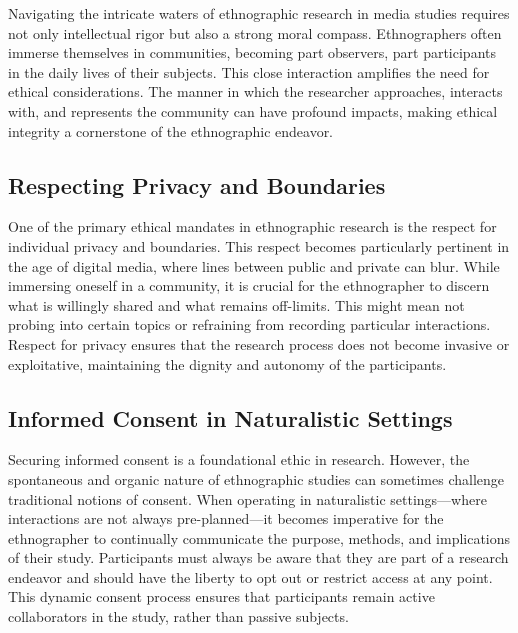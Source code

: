 \documentclass[
  b5paper]{book}
\begin{document}
Navigating the intricate waters of ethnographic research in media studies requires not only intellectual rigor but also a strong moral compass. Ethnographers often immerse themselves in communities, becoming part observers, part participants in the daily lives of their subjects. This close interaction amplifies the need for ethical considerations. The manner in which the researcher approaches, interacts with, and represents the community can have profound impacts, making ethical integrity a cornerstone of the ethnographic endeavor.

\hypertarget{respecting-privacy-and-boundaries}{%
\subsection*{Respecting Privacy and Boundaries}\label{respecting-privacy-and-boundaries}}

One of the primary ethical mandates in ethnographic research is the respect for individual privacy and boundaries. This respect becomes particularly pertinent in the age of digital media, where lines between public and private can blur. While immersing oneself in a community, it is crucial for the ethnographer to discern what is willingly shared and what remains off-limits. This might mean not probing into certain topics or refraining from recording particular interactions. Respect for privacy ensures that the research process does not become invasive or exploitative, maintaining the dignity and autonomy of the participants.

\hypertarget{informed-consent-in-naturalistic-settings}{%
\subsection*{Informed Consent in Naturalistic Settings}\label{informed-consent-in-naturalistic-settings}}

Securing informed consent is a foundational ethic in research. However, the spontaneous and organic nature of ethnographic studies can sometimes challenge traditional notions of consent. When operating in naturalistic settings---where interactions are not always pre-planned---it becomes imperative for the ethnographer to continually communicate the purpose, methods, and implications of their study. Participants must always be aware that they are part of a research endeavor and should have the liberty to opt out or restrict access at any point. This dynamic consent process ensures that participants remain active collaborators in the study, rather than passive subjects.
\end{document}

